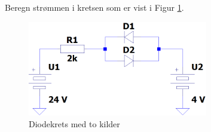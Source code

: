 \begin{question}[name=Oppgave, topic=dioder]
Beregn strømmen i kretsen som er vist i Figur \ref{fig:2kilder}.
	\begin{figure}[H]
			\centering
			\includegraphics[width=0.7\textwidth]{diode/figurer/kretsM2kilder.png}
			\caption{Diodekrets med to kilder}
			\label{fig:2kilder}
		\end{figure}

\end{question}

\vspace{0.5cm} %

